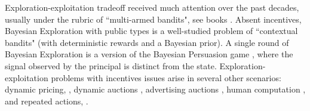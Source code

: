 
Exploration-exploitation tradeoff received much attention over the past decades, usually under the rubric of ``multi-armed bandits", see books \cite{CesaBL-book,Bubeck-survey12,Gittins-book11}. Absent incentives, Bayesian Exploration with public types is a well-studied problem of ``contextual bandits" (with deterministic rewards and a Bayesian prior). A single round of Bayesian Exploration is a version of the Bayesian Persuasion game \cite{Kamenica-aer11}, where the signal observed by the principal is distinct from the state. Exploration-exploitation problems with incentives issues arise in several other scenarios: dynamic pricing, \eg
    \cite{KleinbergL03,BZ09,BwK-focs13},
dynamic auctions \cite{DynAuctions-survey11},
advertising auctions
    \cite{MechMAB-ec09,DevanurK09,Transform-ec10-jacm},
human computation
    \cite{RepeatedPA-ec14,Ghosh-itcs13,Krause-www13},
and repeated actions, \eg
    \cite{Amin-auctions-nips13,Amin-auctions-nips14,Jieming-ec18}.


